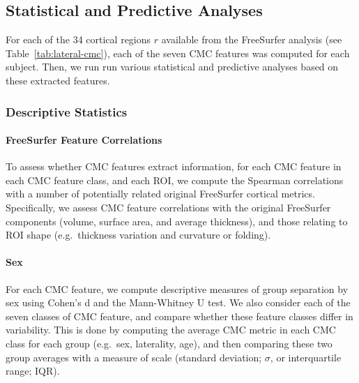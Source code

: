 \documentclass{article}
\begin{document}
%


\subsection{Statistical and Predictive Analyses}

For each of the 34 cortical regions \(r\) available from the FreeSurfer
analysis (see Table~\ref{tab:lateral-cmc}), each of the seven CMC features was
computed for each subject. Then, we run run various statistical and
predictive analyses based on these extracted features.

\subsubsection{Descriptive Statistics}


\paragraph{FreeSurfer Feature Correlations} To assess whether CMC features
extract  information, for each CMC feature in each CMC
feature class, and each ROI, we compute the Spearman correlations with a
number of potentially related original FreeSurfer cortical metrics.
Specifically, we assess CMC feature correlations with the original FreeSurfer
components (volume, surface area, and average thickness), and those relating
to ROI shape (e.g.\ thickness variation and curvature or folding).

%

\paragraph{Sex} For each CMC feature, we compute descriptive measures of
group separation by sex using Cohen's d and the Mann-Whitney U test. We also
consider each of the seven classes of CMC feature, and compare whether these
feature classes differ in variability. This is done by computing the average
CMC metric in each CMC class for each group (e.g.\ sex, laterality, age), and
then comparing these two group averages with a measure of scale (standard
deviation; \(\sigma\), or interquartile range; IQR).
\end{document}
